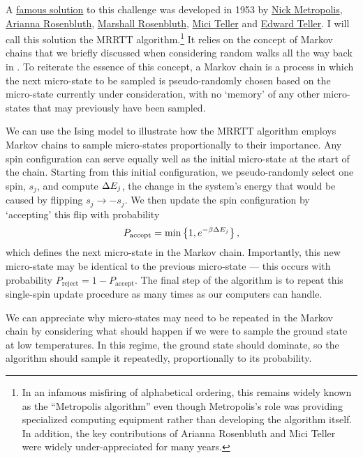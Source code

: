 A \href{https://en.wikipedia.org/wiki/Equation_of_State_Calculations_by_Fast_Computing_Machines}{famous solution} to this challenge was developed in 1953 by \href{https://en.wikipedia.org/wiki/Nicholas_Metropolis}{Nick Metropolis}, \href{https://en.wikipedia.org/wiki/Arianna_W._Rosenbluth}{Arianna Rosenbluth}, \href{https://en.wikipedia.org/wiki/Marshall_Rosenbluth}{Marshall Rosenbluth}, \href{https://en.wikipedia.org/wiki/Augusta_H._Teller}{Mici Teller} and \href{https://en.wikipedia.org/wiki/Edward_Teller}{Edward Teller}.
I will call this solution the MRRTT algorithm.\footnote{In an infamous misfiring of alphabetical ordering, this remains widely known as the ``Metropolis algorithm'' even though Metropolis's role was providing specialized computing equipment rather than developing the algorithm itself.  In addition, the key contributions of Arianna Rosenbluth and Mici Teller were widely under-appreciated for many years.}
It relies on the concept of Markov chains that we briefly discussed when considering random walks all the way back in .
To reiterate the essence of this concept, a Markov chain is a process in which the next micro-state to be sampled is pseudo-randomly chosen based on the micro-state currently under consideration, with no `memory' of any other micro-states that may previously have been sampled.

We can use the Ising model to illustrate how the MRRTT algorithm employs Markov chains to sample micro-states proportionally to their importance.
Any spin configuration can serve equally well as the initial micro-state at the start of the chain.
Starting from this initial configuration, we pseudo-randomly select one spin, $s_j$, and compute $\Delta E_j$, the change in the system's energy that would be caused by flipping $s_j \to -s_j$.
We then update the spin configuration by `accepting' this flip with probability
\begin{equation}
  \label{eq:MRRTTprob}
  P_{\text{accept}} = \mbox{min}\left\{1, e^{-\beta \Delta E_j}\right\},
\end{equation}
which defines the next micro-state in the Markov chain.
Importantly, this new micro-state may be identical to the previous micro-state --- this occurs with probability $P_{\text{reject}} = 1 - P_{\text{accept}}$.
The final step of the algorithm is to repeat this single-spin update procedure as many times as our computers can handle.

We can appreciate why micro-states may need to be repeated in the Markov chain by considering what should happen if we were to sample the ground state at low temperatures.
In this regime, the ground state should dominate, so the algorithm should sample it repeatedly, proportionally to its probability.

